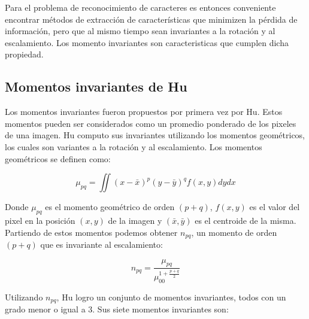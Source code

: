 \documentclass[a4paper, 11pt, oneside]{report}
\begin{document}
Para el problema de reconocimiento de caracteres es entonces conveniente encontrar métodos de extracción de características que minimizen la pérdida de información, pero que al mismo tiempo sean invariantes a la rotación y al escalamiento. Los momento invariantes son caracteristicas que cumplen dicha propiedad.

\subsection{Momentos invariantes de Hu}	
\label{sect:invariants}

Los momentos invariantes fueron propuestos por primera vez por Hu\cite{Hu62}. Estos momentos pueden ser considerados como un promedio ponderado de los pixeles de una imagen. Hu computo sus invariantes utilizando los momentos geométricos, los cuales son variantes a la rotación y al escalamiento. Los momentos geométricos se definen como:

	\begin{equation}\label{eq1}
		\mu_{pq} = \iint{ {(x-\bar{x})^p} {(y-\bar{y})^q} f(x,y) dy dx }
	\end{equation}

Donde $\mu_{pq}$ es el momento geométrico de orden $(p+q)$, $f(x,y)$ es el valor del pixel en la posición $(x,y)$ de la imagen y $(\bar{x},\bar{y})$ es el centroide de la misma. Partiendo de estos momentos podemos obtener $n_{pq}$, un momento de orden $(p+q)$ que es invariante al escalamiento:

	\begin{equation}\label{eq2}
		n_{pq} = \frac{\mu_{pq}}{ \mu_{00}^{1+\frac{p+q}{2}} }
	\end{equation}

Utilizando $n_{pq}$, Hu logro un conjunto de momentos invariantes, todos con un grado menor o igual a 3. Sus siete momentos invariantes son:
\end{document}
